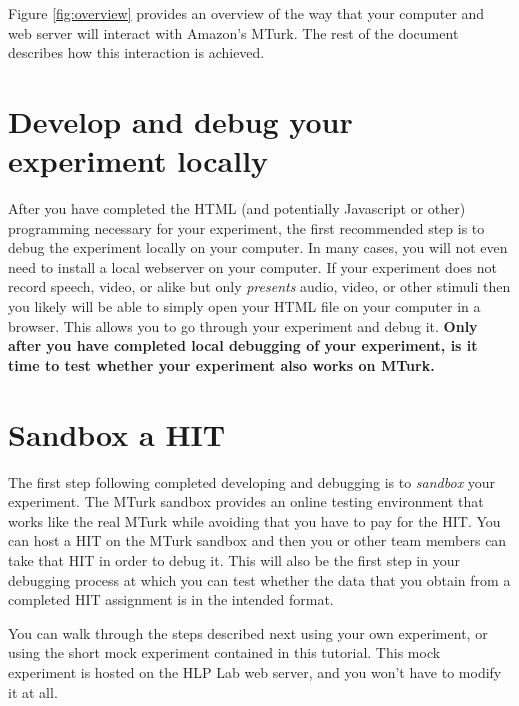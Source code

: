 \documentclass{article}
\begin{document}
Figure \ref{fig:overview} provides an overview of the way that your computer and web server will interact with Amazon's MTurk. The rest of the document describes how this interaction is achieved.


\section{Develop and debug your experiment locally}

After you have completed the HTML (and potentially Javascript or other) programming necessary for your experiment, the first recommended step is to debug the experiment locally on your computer. In many cases, you will not even need to install a local webserver on your computer. If your experiment does not record speech, video, or alike but only {\em presents} audio, video, or other stimuli then you likely will be able to simply open your HTML file on your computer in a browser. This allows you to go through your experiment and debug it. \textbf{Only after you have completed local debugging of your experiment, is it time to test whether your experiment also works on MTurk.}



\section{Sandbox a HIT}

The first step following completed developing and debugging is to {\em sandbox} your experiment. The MTurk sandbox provides an online testing environment that works like the real MTurk while avoiding that you have to pay for the HIT. You can host a HIT on the MTurk sandbox and then you or other team members can take that HIT in order to debug it. This will also be the first step in your debugging process at which you can test whether the data that you obtain from a completed HIT assignment is in the intended format.

You can walk through the steps described next using your own experiment, or using the short mock experiment contained in this tutorial. This mock experiment is hosted on the HLP Lab web server, and you won't have to modify it at all.
\end{document}
